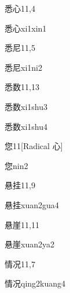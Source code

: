 \begin{entry}{悉心}{11,4}
  \begin{phonetics}{悉心}{xi1xin1}
  \end{phonetics}
\end{entry}

\begin{entry}{悉尼}{11,5}
  \begin{phonetics}{悉尼}{xi1ni2}
  \end{phonetics}
\end{entry}

\begin{entry}{悉数}{11,13}
  \begin{phonetics}{悉数}{xi1shu3}
  \end{phonetics}
  \begin{phonetics}{悉数}{xi1shu4}
  \end{phonetics}
\end{entry}

\begin{entry}{您}{11}[Radical 心]
  \begin{phonetics}{您}{nin2}
  \end{phonetics}
\end{entry}

\begin{entry}{悬挂}{11,9}
  \begin{phonetics}{悬挂}{xuan2gua4}
  \end{phonetics}
\end{entry}

\begin{entry}{悬崖}{11,11}
  \begin{phonetics}{悬崖}{xuan2ya2}
  \end{phonetics}
\end{entry}

\begin{entry}{情况}{11,7}
  \begin{phonetics}{情况}{qing2kuang4}
  \end{phonetics}
\end{entry}

